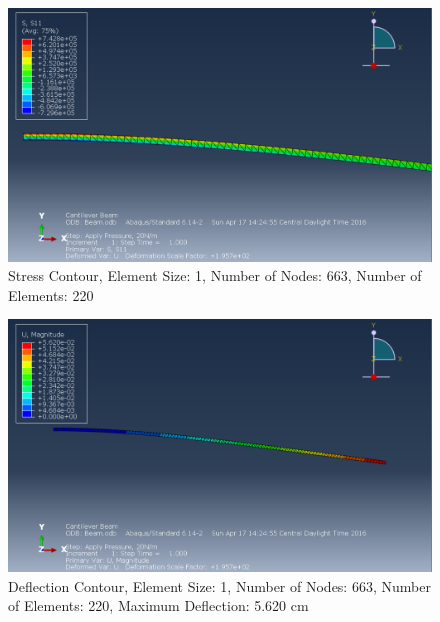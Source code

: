 \documentclass[a4paper]{article}
\begin{document}
\begin{figure}[ht]
\centering
\includegraphics[scale=.5]{6Nsize1Stress.PNG}
\caption{Stress Contour, Element Size: 1, Number of Nodes: 663, Number of Elements: 220}
\end{figure}
\begin{figure}[ht]
\centering
\includegraphics[scale=.5]{6Nsize1MDisplacement.PNG}
\caption{Deflection Contour, Element Size: 1, Number of Nodes: 663, Number of Elements: 220, Maximum Deflection: 5.620 cm}
\end{figure}
\end{document}
